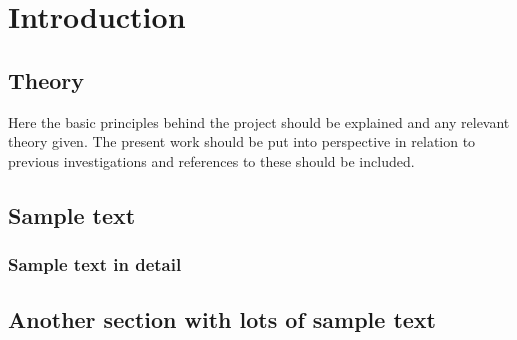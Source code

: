 \chapter{Introduction} \label{chapter:Introduction}
\section{Theory}
Here the basic principles behind the project should be explained and any relevant theory given. The present work should be put into perspective in relation to previous investigations and references to these should be included.
\section{Sample text}
\blindtext
\blindtext
\subsection{Sample text in detail}
\blindtext
\blindtext
\blindtext
\section{Another section with lots of sample text}
\blindtext
\blindtext
\blindtext
\blindtext
\blindtext
\blindtext
\blindtext
\blindtext
\blindtext
\blindtext
\blindtext
\blindtext
\blindtext
\blindtext
\blindtext
\blindtext
\blindtext
\blindtext
\blindtext
